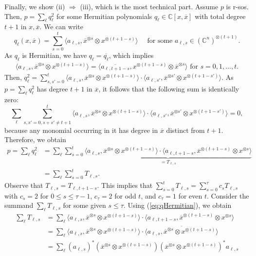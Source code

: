 \documentclass[11pt]{article}
\makeatletter
\newcommand{\C}{\ensuremath{\mathbb{C}}} %
\newcommand{\ot}{\otimes}
\newcommand{\ovx}{\overline x}
\theoremstyle{plain}
\renewenvironment{proof}[1][\proofname]{%
  \par
  \pushQED{}%
  \normalfont
  \topsep6\p@\@plus6\p@
  \trivlist
  \item[\hskip\labelsep\itshape #1\@addpunct{.}]%
}{%
  \popQED
  \endtrivlist
}
\makeatother
\begin{document}
\begin{proof}[Proof of Theorem \ref{theo:FF-BS}]
\medskip
Finally, we show  (ii) $\Longrightarrow$ (iii),  which is the most technical part. Assume $p$ is r-sos. 
Then, $p=\sum_\ell q_\ell^2  $ for some Hermitian polynomials $q_\ell\in \C[x,\ovx]$ with total degree $t+1$ in $x,\ovx$. We can write
$$q_\ell(x,\ovx)= \sum_{s=0}^t \langle a_{\ell,s}, \ovx^{\ot s}\ot x^{\ot (t+1-s)}\rangle \quad \text{ for some } a_{\ell,s}\in (\C^n)^{\ot (t+1)}.$$
As $q_\ell$ is Hermitian, we have $q_\ell=\overline{q_{\ell}}$, which implies
\begin{align}\label{eq:qHermitian}
\langle a_{\ell,s}, \ovx^{\ot s}\ot x^{\ot (t+1-s)}\rangle 
= \langle \overline{a_{\ell, t+1-s}}, x^{\ot (t+1-s)}\ot \ovx^{\ot s}\rangle
 \text{ for } s=0,1,\ldots,t.
\end{align}
Then, $q_\ell^2= \sum_{s,s'=0}^t 
\langle a_{\ell,s}, \ovx^{\ot s}\ot x^{\ot (t+1-s)}\rangle \cdot 
 \langle  {a_{\ell,s'}}, \ovx^{\ot s'}\ot x^{\ot (t+1-s')}\rangle.$
 As $p=\sum_\ell q_\ell^2$ has degree $t+1$ in $\ovx$, it follows that  the following sum  is identically zero:
$$\sum_\ell \sum_{s,s'=0, s+s'\ne t+1}^t \langle a_{\ell,s}, \ovx^{\ot s}\ot x^{\ot (t+1-s)}\rangle \cdot 
 \langle {a_{\ell,s'}}, \ovx^{\ot s'}\ot x^{\ot (t+1-s')}\rangle =0,$$
because any monomial occurring in it has degree in $\ovx$ distinct from $t+1$.
Therefore, we obtain
\begin{align*}
p=\sum_\ell q_\ell ^2 & =
\sum_\ell  \sum_{s=0}^t  
\underbrace{\langle a_{\ell,s}, \ovx^{\ot s}\ot x^{\ot (t+1-s)}\rangle \cdot 
 \langle {a_{\ell,t+1-s}}, \ovx^{\ot (t+1-s)}\ot x^{\ot s}\rangle}_{= T_{\ell,s}} \\
 &= \sum_\ell \sum_{s=0}^t T_{\ell,s}.
\end{align*}
Observe that $T_{\ell,s}=T_{\ell,t+1-s}$. This implies that 
$
\sum_{s=0}^t T_{\ell,s} =\sum_{s=0}^\tau c_s T_{\ell,s}$
with $c_s=2$  for $0\le s\le \tau -1$,
$c_\tau =2$  for odd $t$, and $c_\tau =1$   for even $t$.
Consider  the summand $\sum_{\ell} T_{\ell,s}$ for some  given $s\le \tau$. Using (\ref{eq:qHermitian}), we obtain
\begin{align*}
\sum_\ell T_{\ell,s}  & =\sum_\ell \langle a_{\ell,s}, \ovx^{\ot s}\ot x^{\ot (t+1-s)}\rangle \cdot 
 \langle {a_{\ell,t+1-s}}, \ovx^{\ot (t+1-s)}\ot x^{\ot s}\rangle
 \\
 &= \sum_\ell \langle a_{\ell,s}, \ovx^{\ot s}\ot x^{\ot (t+1-s)}\rangle \cdot 
 \overline{ \langle a_{\ell,s}, \ovx^{\ot s}\ot x^{\ot (t+1-s)}\rangle}  \\
 & =\sum_\ell (a_{\ell,s})^* (\ovx^{\ot s}\ot x^{\ot (t+1-s)}) ( \ovx^{\ot s}\ot x^{\ot (t+1-s)})^*a_{\ell,s} \\

\end{align*}
\end{proof}
\end{document}
